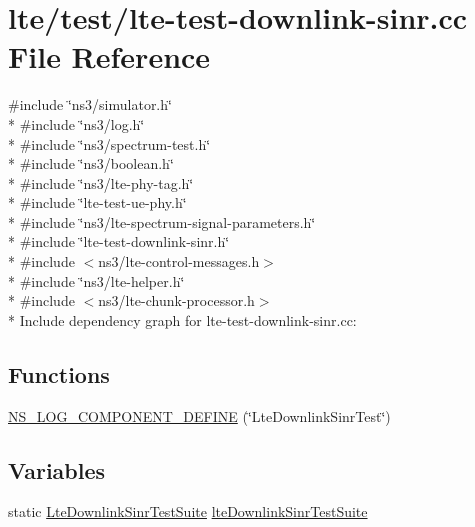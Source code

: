 \hypertarget{lte-test-downlink-sinr_8cc}{}\section{lte/test/lte-\/test-\/downlink-\/sinr.cc File Reference}
\label{lte-test-downlink-sinr_8cc}
{\ttfamily \#include \char`\"{}ns3/simulator.\+h\char`\"{}}\\*
{\ttfamily \#include \char`\"{}ns3/log.\+h\char`\"{}}\\*
{\ttfamily \#include \char`\"{}ns3/spectrum-\/test.\+h\char`\"{}}\\*
{\ttfamily \#include \char`\"{}ns3/boolean.\+h\char`\"{}}\\*
{\ttfamily \#include \char`\"{}ns3/lte-\/phy-\/tag.\+h\char`\"{}}\\*
{\ttfamily \#include \char`\"{}lte-\/test-\/ue-\/phy.\+h\char`\"{}}\\*
{\ttfamily \#include \char`\"{}ns3/lte-\/spectrum-\/signal-\/parameters.\+h\char`\"{}}\\*
{\ttfamily \#include \char`\"{}lte-\/test-\/downlink-\/sinr.\+h\char`\"{}}\\*
{\ttfamily \#include $<$ns3/lte-\/control-\/messages.\+h$>$}\\*
{\ttfamily \#include \char`\"{}ns3/lte-\/helper.\+h\char`\"{}}\\*
{\ttfamily \#include $<$ns3/lte-\/chunk-\/processor.\+h$>$}\\*
Include dependency graph for lte-\/test-\/downlink-\/sinr.cc\+:
\subsection*{Functions}
\begin{DoxyCompactItemize}
\item 
\hyperlink{lte-test-downlink-sinr_8cc_aa69fb04f3ccf99fe490455910ec412a8}{N\+S\+\_\+\+L\+O\+G\+\_\+\+C\+O\+M\+P\+O\+N\+E\+N\+T\+\_\+\+D\+E\+F\+I\+NE} (\char`\"{}Lte\+Downlink\+Sinr\+Test\char`\"{})
\end{DoxyCompactItemize}
\subsection*{Variables}
\begin{DoxyCompactItemize}
\item 
static \hyperlink{classLteDownlinkSinrTestSuite}{Lte\+Downlink\+Sinr\+Test\+Suite} \hyperlink{lte-test-downlink-sinr_8cc_a54602f3ecd05e57371fce8c069153dee}{lte\+Downlink\+Sinr\+Test\+Suite}
\end{DoxyCompactItemize}


